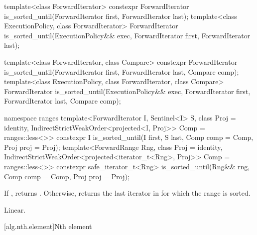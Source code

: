 %
\begin{itemdecl}
template<class ForwardIterator>
  constexpr ForwardIterator
    is_sorted_until(ForwardIterator first, ForwardIterator last);
template<class ExecutionPolicy, class ForwardIterator>
  ForwardIterator
    is_sorted_until(ExecutionPolicy&& exec,
                    ForwardIterator first, ForwardIterator last);

template<class ForwardIterator, class Compare>
  constexpr ForwardIterator
    is_sorted_until(ForwardIterator first, ForwardIterator last,
                    Compare comp);
template<class ExecutionPolicy, class ForwardIterator, class Compare>
  ForwardIterator
    is_sorted_until(ExecutionPolicy&& exec,
                    ForwardIterator first, ForwardIterator last,
                    Compare comp);
\end{itemdecl}
\begin{addedblock}
\begin{itemdecl}
namespace ranges {
  template<ForwardIterator I, Sentinel<I> S, class Proj = identity,
      IndirectStrictWeakOrder<projected<I, Proj>> Comp = ranges::less<>>
    constexpr I is_sorted_until(I first, S last, Comp comp = Comp{}, Proj proj = Proj{});
  template<ForwardRange Rng, class Proj = identity,
      IndirectStrictWeakOrder<projected<iterator_t<Rng>, Proj>> Comp = ranges::less<>>
    constexpr safe_iterator_t<Rng>
      is_sorted_until(Rng&& rng, Comp comp = Comp{}, Proj proj = Proj{});
}
\end{itemdecl}
\end{addedblock}

\begin{itemdescr}
\pnum
\returns If , returns
. Otherwise, returns
the last iterator  in  for which the
range  is sorted.

\pnum
\complexity Linear.
\end{itemdescr}


[alg.nth.element]{Nth element}

